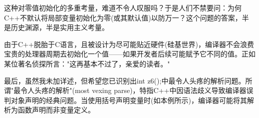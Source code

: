 这种对零值初始化的多重考量，难道不令人叹服吗？于是人们不禁要问：为何C++不默认将局部变量初始化为零(或其默认值)以防万一？这个问题的答案，半是历史渊源，半是实用主义考量。

由于C++脱胎于C语言，且被设计为尽可能贴近硬件(硅基世界)，编译器不会浪费宝贵的处理器周期去初始化一个值——如果开发者后续可能赋予它不同的值。正如某位著名侦探所言："这再基本不过了，亲爱的读者。"

最后，虽然我未加详述，但希望您已识别出int z6();中最令人头疼的解析问题。所谓"最令人头疼的解析"(most vexing parse)，特指C++中因语法歧义导致编译器误判对象声明的经典问题。当使用括号声明变量时(如本例所示)，编译器可能将其解析为函数声明而非变量定义。












